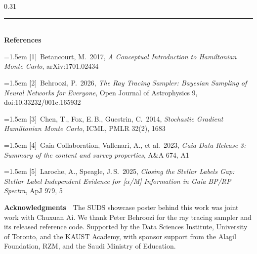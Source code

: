 \documentclass[final]{beamer}
\newcommand{\refitem}[2]{\noindent\hangindent=1.5em\hangafter=1 [#1]~#2\par}
\begin{document}
\begin{frame}[t]
\begin{columns}[t]
\begin{column}{0.31\paperwidth}
{\footnotesize\setlength{\parskip}{0.20\baselineskip}
\noindent\textcolor{uoftblue}{\rule{\linewidth}{0.7mm}}\\[0.35ex]
\textbf{References}\par
\refitem{1}{Betancourt, M.\ 2017, \emph{A Conceptual Introduction to Hamiltonian Monte Carlo}, arXiv:1701.02434}
\refitem{2}{Behroozi, P.\ 2026, \emph{The Ray Tracing Sampler: Bayesian Sampling of Neural Networks for Everyone}, Open Journal of Astrophysics 9, doi:10.33232/001c.165932}
\refitem{3}{Chen, T., Fox, E.\,B., Guestrin, C.\ 2014, \emph{Stochastic Gradient Hamiltonian Monte Carlo}, ICML, PMLR 32(2), 1683}
\refitem{4}{Gaia Collaboration, Vallenari, A., et al.\ 2023, \emph{Gaia Data Release 3: Summary of the content and survey properties}, A\&A 674, A1}
\refitem{5}{Laroche, A., Speagle, J.\,S.\ 2025, \emph{Closing the Stellar Labels Gap: Stellar Label Independent Evidence for [\(\alpha\)/M] Information in Gaia BP/RP Spectra}, ApJ 979, 5}
\vspace{0.30cm}

\noindent\textbf{Acknowledgments}\ \ The SUDS showcase poster behind this work
was joint work with Chuxuan Ai. We thank Peter Behroozi for the ray tracing
sampler and its released reference code. Supported by the Data Sciences
Institute, University of Toronto, and the KAUST Academy, with sponsor support
from the Alagil Foundation, RZM, and the Saudi Ministry of Education.
}

\end{column}

\end{columns}

\end{frame}
\end{document}
